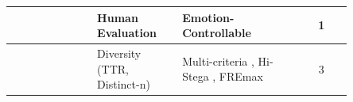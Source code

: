 \begin{table}[ht]
\begin{tabular}{|>{\raggedright\arraybackslash}p{0.25\linewidth}|>{\raggedright\arraybackslash}p{0.25\linewidth}|>{\raggedright\arraybackslash}p{0.35\linewidth}|c|}
                                & Human Evaluation                    & Emotion-Controllable \cite{shi2025emotionally}                                                                                                                                                                                                                                                                                                                                                                                                                                                                                                                                                                                                                                                                                                                                                                                                                                                                                                                                                   & 1                    \\
    \cline{2-4}
                                & Diversity (TTR, Distinct-n)         & Multi-criteria \cite{wozniak2025multicriteria}, Hi-Stega \cite{wang2023hi}, FREmax \cite{pang2024fremax}                                                                                                                                                                                                                                                                                                                                                                                                                                                                                                                                                                                                                                                                                                                                                                                                                                                                                         & 3                    \\
    \hline

\end{tabular}
\end{table}
